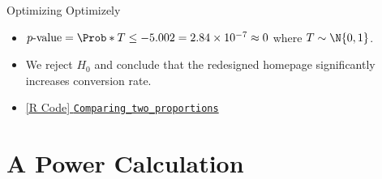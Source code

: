 \begin{Example}{Optimizing Optimizely}{}
\begin{itemize}
                  \[ \hat{\pi}=\frac{8872(0.0316)+8642(0.0462)}{17514} \]
                  \[ t=\frac{0.0316-0.0462}{\sqrt{(0.0388)(1-0.0388)(1/8872+1/8642)}}=-5.002  \]
            \item $ p\text{-value}=\Prob*{T\le -5.002}=2.84\times 10^{-7}\approx 0 $ where $ T \sim \N{0,1} $.
            \item We reject $ H_0 $ and conclude that the redesigned homepage significantly
                  increases conversion rate.
            \item \href{https://github.com/Hextical/university-notes/blob/master/year-3/semester-3/STAT%20430/code/2.3%20-%20Comparing_two_proportions.R}{[R Code] \texttt{Comparing\_two\_proportions}}
      \end{itemize}
\end{Example}
\section{A Power Calculation}
